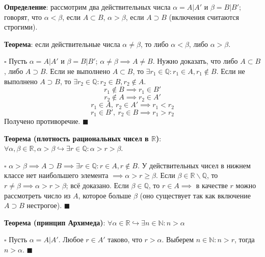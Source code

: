 \documentclass[12pt, a4paper, reqno]{article}
\begin{document}
    \textbf{Определение}: рассмотрим два действительных числа $\alpha = A|A'$ и $\beta = B|B'$;
    говорят, что $\alpha < \beta$, если $A \subset B$, $\alpha > \beta$, если $A \supset B$
    (включения считаются строгими).

    \textbf{Теорема}: если действительные числа $\alpha \neq \beta$, то либо $\alpha < \beta$, либо
    $\alpha > \beta$.

    $\square$ Пусть $\alpha = A|A'$ и $\beta = B|B'$; $\alpha \neq \beta \implies A \neq B$.
    Нужно доказать, что либо $A \subset B$, либо $A \supset B$. Если не выполнено $A \subset B$, то
    $\exists r_1 \in \mathbb{Q}: r_1 \in A, r_1 \not\in B$. Если не выполнено $A \supset B$, то
    $\exists r_2 \in \mathbb{Q}: r_2 \in B, r_2 \not\in A$.
    \begin{equation*}
        r_1 \not\in B \implies r_1 \in B'
    \end{equation*}
    \begin{equation*}
        r_2 \not\in A \implies r_2 \in A'
    \end{equation*}
    \begin{equation*}
        r_1 \in A,\ r_2 \in A' \implies r_1 < r_2
    \end{equation*}
    \begin{equation*}
        r_1 \in B',\ r_2 \in B \implies r_1 > r_2
    \end{equation*}
    Получено противоречие. $\blacksquare$

    \textbf{Теорема (плотность рациональных чисел в $\mathbb{R}$)}: $\forall \alpha, \beta \in
    \mathbb{R}, \alpha > \beta \hookrightarrow \exists r \in \mathbb{Q}: \alpha > r > \beta$.

    $\square$ $\alpha > \beta \implies A \supset B \implies \exists r \in \mathbb{Q}: r \in A,
    r \not\in B$. У действительных чисел в нижнем классе нет наибольшего элемента $\implies \alpha >
    r \geq \beta$. Если $\beta \in \mathbb{R}\backslash \mathbb{Q}$, то $r \neq \beta \implies
    \alpha > r > \beta$; всё доказано. Если $\beta \in \mathbb{Q}$, то $r \in A \implies$ в качестве
    $r$ можно рассмотреть число из $A$, которое больше $\beta$ (оно существует так как включение
    $A \supset B$ нестрогое). $\blacksquare$

    \textbf{Теорема (принцип Архимеда)}: $\forall \alpha \in \mathbb{R} \hookrightarrow \exists n
    \in \mathbb{N}: n > \alpha$

    $\square$ Пусть $\alpha = A|A'$. Любое $r \in A'$ таково, что $r > \alpha$. Выберем $n \in
    \mathbb{N}: n > r$, тогда $n > \alpha$. $\blacksquare$
\end{document}
